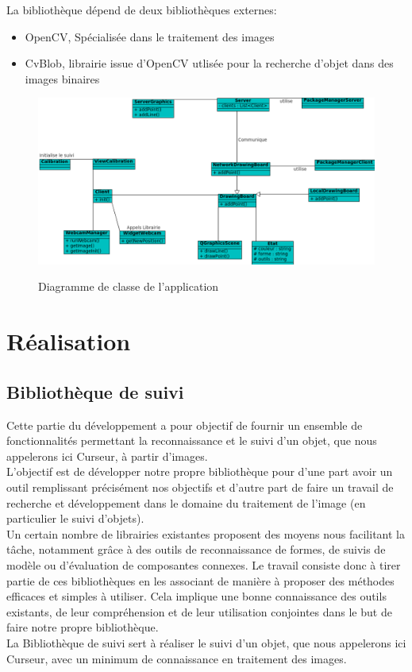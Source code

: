 \documentclass{report}
\begin{document}
				La bibliothèque dépend de deux bibliothèques externes:
				\begin{itemize}
					\item OpenCV, Spécialisée dans le traitement des images
					\item CvBlob, librairie issue d'OpenCV utlisée pour la recherche d'objet dans des images binaires
				\end{itemize}

				\newpage			

				\begin{figure}[!h]
						\centering
						\includegraphics[scale=0.6]{../uml/classes.png}\\
						\caption{Diagramme de classe de l'application}
						\label{Diagramme de classe de l'application}
				\end{figure}

				
	
	\chapter{Réalisation}
		\section{Bibliothèque de suivi}
			Cette partie du développement a pour objectif de fournir un ensemble de fonctionnalités permettant la reconnaissance et le suivi d'un objet, que nous appelerons ici Curseur, à partir d'images. \\
			L'objectif est de développer notre propre bibliothèque pour d'une part avoir un outil remplissant précisément nos objectifs et d'autre part de faire un travail de recherche et développement dans le domaine du traitement de l'image (en particulier le suivi d'objets). \\
			Un certain nombre de librairies existantes proposent des moyens nous facilitant la tâche, notamment grâce à des outils de reconnaissance de formes, de suivis de modèle ou d'évaluation de composantes connexes. 
			Le travail consiste donc à tirer partie de ces bibliothèques en les associant de manière à proposer des méthodes efficaces et simples à utiliser.
			Cela implique une bonne connaissance des outils existants, de leur compréhension et de leur utilisation conjointes dans le but de faire notre propre bibliothèque. \\
			La Bibliothèque de suivi sert à réaliser le suivi d'un objet, que nous appelerons ici Curseur, avec un minimum de connaissance en traitement des images.\\
			
\end{document}
